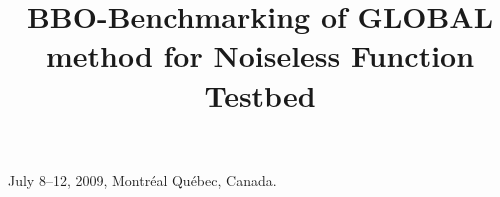 \documentclass{sig-alternate}
\begin{document}
%
 {July 8--12, 2009, Montr\'eal Qu\'ebec, Canada.}

\title{BBO-Benchmarking of GLOBAL method for Noiseless
Function Testbed
}

%
%
%
%
%
\end{document}
